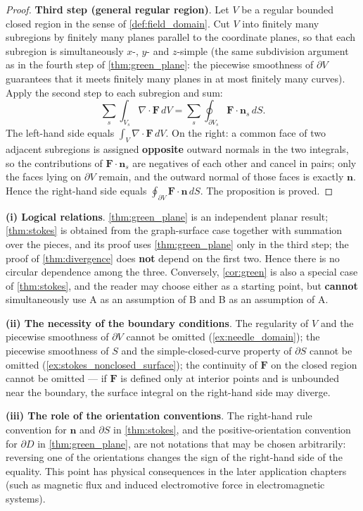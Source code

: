 \begin{proof}
\textbf{Third step (general regular region)}. Let $V$ be a regular bounded closed region in the sense of \cref{def:field_domain}. Cut $V$ into finitely many subregions by finitely many planes parallel to the coordinate planes, so that each subregion is simultaneously $x$-, $y$- and $z$-simple (the same subdivision argument as in the fourth step of \cref{thm:green_plane}: the piecewise smoothness of $\partial V$ guarantees that it meets finitely many planes in at most finitely many curves). Apply the second step to each subregion and sum:
\[
\sum_s\int_{V_s}\nabla\cdot\mathbf F\,dV = \sum_s\oint_{\partial V_s}\mathbf F\cdot\mathbf n_s\,dS .
\]
The left-hand side equals $\int_V\nabla\cdot\mathbf F\,dV$. On the right: a common face of two adjacent subregions is assigned \textbf{opposite} outward normals in the two integrals, so the contributions of $\mathbf F\cdot\mathbf n_s$ are negatives of each other and cancel in pairs; only the faces lying on $\partial V$ remain, and the outward normal of those faces is exactly $\mathbf n$. Hence the right-hand side equals $\oint_{\partial V}\mathbf F\cdot\mathbf n\,dS$. The proposition is proved.
\end{proof}

\begin{remark}\label{rem:integral_theorems_scope}
\textbf{(i) Logical relations}. \cref{thm:green_plane} is an independent planar result; \cref{thm:stokes} is obtained from the graph-surface case together with summation over the pieces, and its proof uses \cref{thm:green_plane} only in the third step; the proof of \cref{thm:divergence} does \textbf{not} depend on the first two. Hence there is no circular dependence among the three. Conversely, \cref{cor:green} is also a special case of \cref{thm:stokes}, and the reader may choose either as a starting point, but \textbf{cannot} simultaneously use A as an assumption of B and B as an assumption of A.

\textbf{(ii) The necessity of the boundary conditions}. The regularity of $V$ and the piecewise smoothness of $\partial V$ cannot be omitted (\cref{ex:needle_domain}); the piecewise smoothness of $S$ and the simple-closed-curve property of $\partial S$ cannot be omitted (\cref{ex:stokes_nonclosed_surface}); the continuity of $\mathbf F$ on the closed region cannot be omitted --- if $\mathbf F$ is defined only at interior points and is unbounded near the boundary, the surface integral on the right-hand side may diverge.

\textbf{(iii) The role of the orientation conventions}. The right-hand rule convention for $\mathbf n$ and $\partial S$ in \cref{thm:stokes}, and the positive-orientation convention for $\partial D$ in \cref{thm:green_plane}, are not notations that may be chosen arbitrarily: reversing one of the orientations changes the sign of the right-hand side of the equality. This point has physical consequences in the later application chapters (such as magnetic flux and induced electromotive force in electromagnetic systems).
\end{remark}

